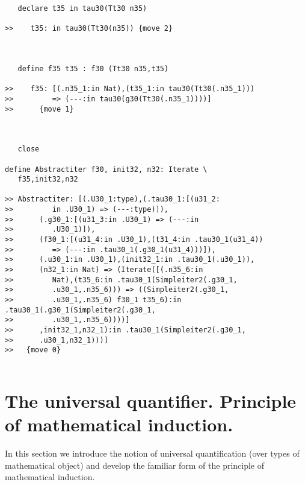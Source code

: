 \documentclass[12pt]{article}
\begin{document}
\begin{verbatim}
   declare t35 in tau30(Tt30 n35)

>>    t35: in tau30(Tt30(n35)) {move 2}



   define f35 t35 : f30 (Tt30 n35,t35)

>>    f35: [(.n35_1:in Nat),(t35_1:in tau30(Tt30(.n35_1)))
>>         => (---:in tau30(g30(Tt30(.n35_1))))]
>>      {move 1}



   close

define Abstractiter f30, init32, n32: Iterate \
   f35,init32,n32

>> Abstractiter: [(.U30_1:type),(.tau30_1:[(u31_2:
>>         in .U30_1) => (---:type)]),
>>      (.g30_1:[(u31_3:in .U30_1) => (---:in
>>         .U30_1)]),
>>      (f30_1:[(u31_4:in .U30_1),(t31_4:in .tau30_1(u31_4))
>>         => (---:in .tau30_1(.g30_1(u31_4)))]),
>>      (.u30_1:in .U30_1),(init32_1:in .tau30_1(.u30_1)),
>>      (n32_1:in Nat) => (Iterate([(.n35_6:in
>>         Nat),(t35_6:in .tau30_1(Simpleiter2(.g30_1,
>>         .u30_1,.n35_6))) => ((Simpleiter2(.g30_1,
>>         .u30_1,.n35_6) f30_1 t35_6):in .tau30_1(.g30_1(Simpleiter2(.g30_1,
>>         .u30_1,.n35_6))))]
>>      ,init32_1,n32_1):in .tau30_1(Simpleiter2(.g30_1,
>>      .u30_1,n32_1)))]
>>   {move 0}


\end{verbatim}

\section{The universal quantifier.  Principle of mathematical induction.}

In this section we introduce the notion of universal quantification (over types of mathematical object)  and develop the familiar form of the principle of mathematical induction.
\end{document}
